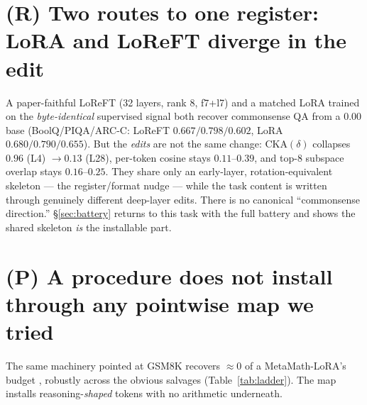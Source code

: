 \documentclass{article}
\begin{document}
\section{(R) Two routes to one register: LoRA and LoReFT diverge in the edit}
\label{sec:routes}

A paper-faithful LoReFT (32 layers, rank 8, f7+l7) and a matched LoRA trained on the
\emph{byte-identical} supervised signal both recover commonsense QA from a $0.00$ base
(BoolQ/PIQA/ARC-C: LoReFT $0.667/0.798/0.602$, LoRA $0.680/0.790/0.655$). But the \emph{edits} are
not the same change: $\mathrm{CKA}(\delta)$ collapses $0.96$ (L4) $\to 0.13$ (L28), per-token
cosine stays $0.11$--$0.39$, and top-8 subspace overlap stays $0.16$--$0.25$. They share only an
early-layer, rotation-equivalent skeleton --- the register/format nudge --- while the task content
is written through genuinely different deep-layer edits. There is no canonical ``commonsense
direction.'' \S\ref{sec:battery} returns to this task with the full battery and shows the shared
skeleton \emph{is} the installable part.

\section{(P) A procedure does not install through any pointwise map we tried}
\label{sec:ladder}

The same machinery pointed at GSM8K recovers ${\approx}0$ of a MetaMath-LoRA's budget
\citep{yu2024metamath}, robustly across the obvious salvages (Table~\ref{tab:ladder}). The map
installs reasoning-\emph{shaped} tokens with no arithmetic underneath.
\end{document}

